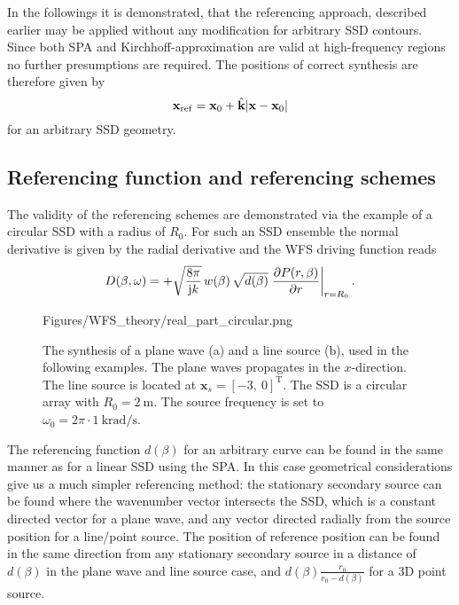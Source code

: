 In the followings it is demonstrated, that the referencing approach, described earlier may be applied without any modification for arbitrary SSD contours. 
Since both SPA and Kirchhoff-approximation are valid at high-frequency regions no further presumptions are required. The positions of correct synthesis are therefore given by
\begin{equation}
\mathbf{x}_{\mathrm{ref}} = \mathbf{x}_0 + \hat{\mathbf{k}} |\mathbf{x}-\mathbf{x}_0|
\end{equation}
for an arbitrary SSD geometry.


\subsection{Referencing function and referencing schemes}

The validity of the referencing schemes are demonstrated via the example of a circular SSD with a radius of $R_0$. 
For such an SSD ensemble the normal derivative is given by the radial derivative and the WFS driving function reads
\begin{equation}
D(\beta,\omega) = + \sqrt{\frac{8\pi}{\mathrm{j} k}}\,w(\beta)\,\sqrt{d(\beta)} \left. \frac{\partial P(r,\beta)}{\partial r}  \right|_{r = R_0}.
\end{equation}

\begin{figure}
	 \centering
	 \begin{overpic}[width = .95\columnwidth]{Figures/WFS_theory/real_part_circular.png}
	 \end{overpic}
 \caption{ The synthesis of a plane wave (a) and a line source (b), used in the following examples. The plane waves propagates in the $x$-direction. The line source is located at $\mathbf{x}_s = [-3,\ 0]^{\mathrm{T}}$. The SSD is a circular array with $R_0 = 2~\mathrm{m}$. The source frequency is set to $\omega_0 = 2\pi	\cdot 1 ~\mathrm{krad/s}$.}
	 \label{Fig:Theory:real_part_circular}
 \end{figure}
%
The referencing function $d(\beta)$ for an arbitrary curve can be found in the same manner as for a linear SSD using the SPA. 
In this case geometrical considerations give us a much simpler referencing method: the stationary secondary source can be found where the wavenumber vector intersects the SSD, which is a constant directed vector for a plane wave, and any vector directed radially from the source position for a line/point source. 
The position of reference position can be found in the same direction from any stationary secondary source in a distance of $d(\beta)$ in the plane wave and line source case, and $d(\beta)\frac{r_0}{r_0-d(\beta)}$ for a 3D point source.

